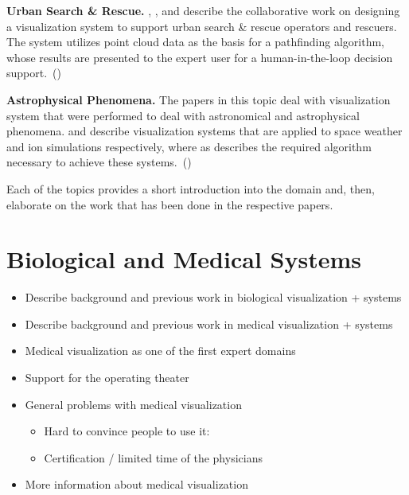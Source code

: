 \textbf{Urban Search \& Rescue. } , , and  describe the collaborative work on designing a visualization system to support urban search \& rescue operators and rescuers. The system utilizes  point cloud data as the basis for a pathfinding algorithm, whose results are presented to the expert user for a human-in-the-loop decision support.~()

\textbf{Astrophysical Phenomena. } The papers in this topic deal with visualization system that were performed to deal with astronomical and astrophysical phenomena.  and  describe visualization systems that are applied to space weather and ion simulations respectively, where as  describes the required algorithm necessary to achieve these systems.~()

Each of the topics provides a short introduction into the domain and, then, elaborate on the work that has been done in the respective papers.


\section{Biological and Medical Systems}
\label{contributions:medbio}
\begin{itemize}
\item Describe background and previous work in biological visualization + systems
\item Describe background and previous work in medical visualization + systems
\item Medical visualization as one of the first expert domains
\item Support for the operating theater
\item General problems with medical visualization
\begin{itemize}
    \item Hard to convince people to use it:
    \item Certification / limited time of the physicians
\end{itemize}
\item More information about medical visualization \cite{preim2007visualization}
\end{itemize}

